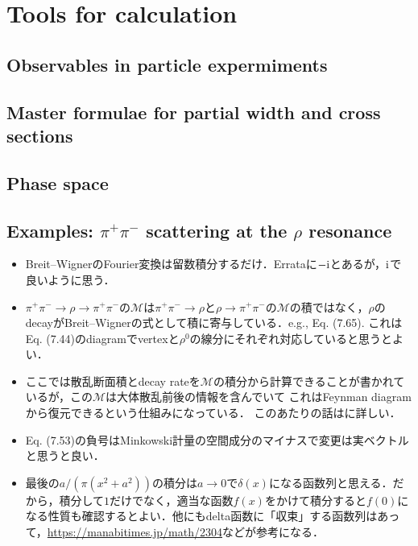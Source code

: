 \section{Tools for calculation}
\subsection{Observables in particle expermiments}
\subsection{Master formulae for partial width and cross sections}
\subsection{Phase space}
\subsection{Examples: $\pi^{+}\pi^{-}$ scattering at the $\rho $ resonance}
\begin{itemize}
		\item Breit--WignerのFourier変換は留数積分するだけ．Errataに$-\mathrm{i} $とあるが，$\mathrm{i} $で良いように思う．
		\item $\pi^{+}\pi^{-}\to \rho\to \pi^{+}\pi^{-} $の$\mathcal{M} $は$\pi^{+}\pi^{-}\to \rho$と$\rho\to \pi^{+}\pi^{-}  $の$\mathcal{M} $の積ではなく，$\rho$のdecayがBreit--Wignerの式として積に寄与している．e.g., Eq. (7.65). これはEq. (7.44)のdiagramでvertexと$\rho^0 $の線分にそれぞれ対応していると思うとよい．
		\item ここでは散乱断面積とdecay rateを$\mathcal{M}$の積分から計算できることが書かれているが，この$\mathcal{M}$は大体散乱前後の情報を含んでいて
			これはFeynman diagramから復元できるという仕組みになっている．
			このあたりの話は\cite[Section 4.5, 4.6]{Peskin:1995ev}に詳しい．
		\item Eq. (7.53)の負号はMinkowski計量の空間成分のマイナスで変更は実ベクトルと思うと良い．
		\item 最後の$a/(\pi(x^2+a^2)) $の積分は$a\to 0 $で$\delta(x) $になる函数列と思える．だから，積分して$1 $だけでなく，適当な函数$f(x) $をかけて積分すると$f(0) $になる性質も確認するとよい．他にもdelta函数に「収束」する函数列はあって，\url{https://manabitimes.jp/math/2304}などが参考になる．
\end{itemize}
